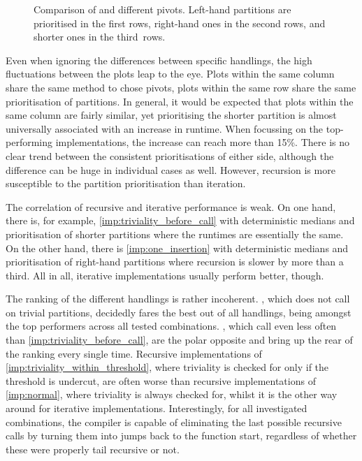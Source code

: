 \begin{figure}[p]
	\tikzexternaldisable
	\hfil{}\hfil
	\tikzexternalenable
	\caption{
		Comparison of  and different pivots.
		Left-hand partitions are prio\-ri\-tised in the first rows, right-hand ones in the second rows, and shorter ones in the third~rows.
	}
	\label{fig:quick:implementations}
\end{figure}

Even when ignoring the differences between specific handlings, the high fluctuations between the plots leap to the eye.
Plots within the same column share the same method to chose pivots, plots within the same row share the same prioritisation of partitions.
In general, it would be expected that plots within the same column are fairly similar, yet prioritising the shorter partition is almost universally associated with an increase in runtime.
When focussing on the top-performing implementations, the increase can reach more than 15\%.
There is no clear trend between the consistent prioritisations of either side, although the difference can be huge in individual cases as well.
However, recursion is more susceptible to the partition prioritisation than iteration.

The correlation of recursive and iterative performance is weak.
On one hand, there is, for example, \cref{imp:triviality_before_call} with deterministic medians and prioritisation of shorter partitions where the runtimes are essentially the same.
On the other hand, there is \cref{imp:one_insertion} with deterministic medians and prioritisation of right-hand partitions where recursion is slower by more than a third.
All in all, iterative implementations usually perform better, though.

The ranking of the different handlings is rather incoherent.
, which does not call \QS{} on trivial partitions, decidedly fares the best out of all handlings, being amongst the top performers across all tested combinations.
, which call \QS{} even less often than \cref{imp:triviality_before_call}, are the polar opposite and bring up the rear of the ranking every single time.
Recursive implementations of \cref{imp:triviality_within_threshold}, where triviality is checked for only if the threshold is undercut, are often worse than recursive implementations of \cref{imp:normal}, where triviality is always checked for, whilst it is the other way around for iterative implementations.
Interestingly, for all investigated combinations, the compiler is capable of eliminating the last possible recursive calls by turning them into jumps back to the function start, regardless of whether these were properly tail recursive or not.

